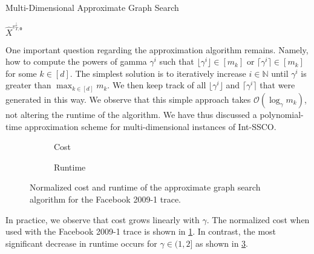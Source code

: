 \begin{algorithm}
    \caption{Multi-Dimensional Approximate Graph Search~\cite{Albers2021_2}}\label{alg:md:approximate_graph_search}
    \Return $\hat{X}^{v_{T,\mathbf{0}}^{\downarrow}}$\;
\end{algorithm}

One important question regarding the approximation algorithm remains. Namely, how to compute the powers of gamma $\gamma^i$ such that $\lfloor\gamma^i\rfloor \in [m_k]$ or $\lceil\gamma^i\rceil \in [m_k]$ for some $k \in [d]$. The simplest solution is to iteratively increase $i \in \mathbb{N}$ until $\gamma^i$ is greater than $\max_{k \in [d]} m_k$. We then keep track of all $\lfloor\gamma^i\rfloor$ and $\lceil\gamma^i\rceil$ that were generated in this way. We observe that this simple approach takes $\mathcal{O}(\log_{\gamma} m_k)$, not altering the runtime of the algorithm. We have thus discussed a polynomial-time approximation scheme for multi-dimensional instances of Int-SSCO.

\begin{figure}
    \begin{subfigure}[b]{.5\linewidth}
    \resizebox{\textwidth}{!}{}
    \caption{Cost}\label{fig:approx_graph_search:cost}
    \end{subfigure}
    \begin{subfigure}[b]{.5\linewidth}
    \resizebox{\textwidth}{!}{}
    \caption{Runtime}\label{fig:approx_graph_search:runtime}
    \end{subfigure}
    \caption{Normalized cost and runtime of the approximate graph search algorithm for the Facebook 2009-1 trace.}
\end{figure}

In practice, we observe that cost grows linearly with $\gamma$. The normalized cost when used with the Facebook 2009-1 trace is shown in \cref{fig:approx_graph_search:cost}. In contrast, the most significant decrease in runtime occurs for $\gamma \in (1, 2]$ as shown in \cref{fig:approx_graph_search:runtime}.
